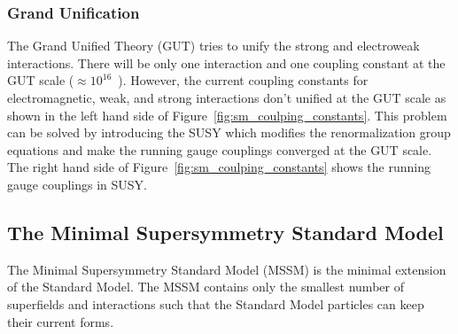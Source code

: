 
\subsubsection{Grand Unification}
\label{subsubsec:susy_gut}
The Grand Unified Theory (GUT) tries to unify the strong and electroweak interactions.
There will be only one interaction and one coupling constant at the GUT scale ($\approx 10^{16}$~{\GeV}).
However, the current coupling constants for electromagnetic, weak, and strong interactions don't unified at the GUT scale as shown in the left hand side of Figure~\ref{fig:sm_coulping_constants}.
This problem can be solved by introducing the SUSY which modifies the renormalization group equations and make the running gauge couplings converged at the GUT scale.
The right hand side of Figure~\ref{fig:sm_coulping_constants} shows the running gauge couplings in SUSY.


\subsection{The Minimal Supersymmetry Standard Model}
\label{subsec:susy_mssm}
The Minimal Supersymmetry Standard Model (MSSM) is the minimal extension of the Standard Model.
The MSSM contains only the smallest number of superfields and interactions such that the Standard Model particles can keep their current forms.


